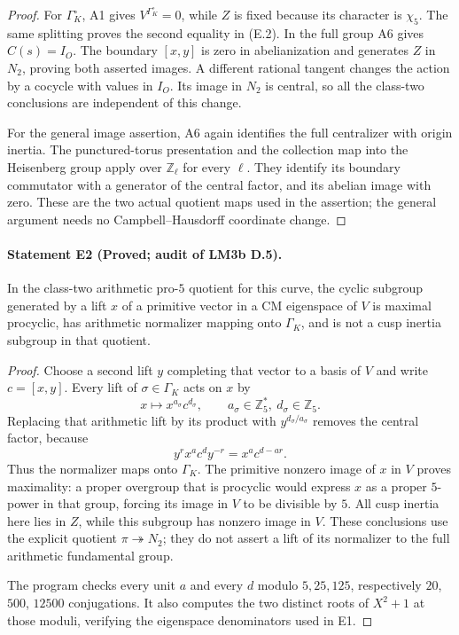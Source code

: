 \begin{proof}
For $\Gamma_K^\circ$, A1 gives $V^{\Gamma_K^\circ}=0$, while $Z$ is fixed because its character is $\chi_5$. The same splitting proves the second equality in (E.2). In the full group A6 gives $C(s)=I_O$. The boundary $[x,y]$ is zero in abelianization and generates $Z$ in $N_2$, proving both asserted images. A different rational tangent changes the action by a cocycle with values in $I_O$. Its image in $N_2$ is central, so all the class-two conclusions are independent of this change.

For the general image assertion, A6 again identifies the full centralizer
with origin inertia. The punctured-torus presentation and the collection
map into the Heisenberg group apply over $\mathbb Z_\ell$ for every
$\ell$. They identify its boundary commutator with a generator of the
central factor, and its abelian image with zero. These are the two actual
quotient maps used in the assertion; the general argument needs no
Campbell--Hausdorff coordinate change.
\end{proof}

\paragraph{Statement E2 (Proved; audit of LM3b D.5).}\label{res:E2}
In the class-two arithmetic pro-$5$ quotient for this curve, the cyclic subgroup generated by a lift $x$ of a primitive vector in a CM eigenspace of $V$ is maximal procyclic, has arithmetic normalizer mapping onto $\Gamma_K$, and is not a cusp inertia subgroup in that quotient.

\begin{proof}
Choose a second lift $y$ completing that vector to a basis of $V$ and write $c=[x,y]$. Every lift of $\sigma\in\Gamma_K$ acts on $x$ by
\[
 x\longmapsto x^{a_\sigma}c^{d_\sigma},\qquad
 a_\sigma\in\mathbb Z_5^*,\ d_\sigma\in\mathbb Z_5.
\]
Replacing that arithmetic lift by its product with $y^{d_\sigma/a_\sigma}$ removes the central factor, because
\[
 y^r x^a c^d y^{-r}=x^a c^{d-ar}.
\]
Thus the normalizer maps onto $\Gamma_K$. The primitive nonzero image of $x$ in $V$ proves maximality: a proper overgroup that is procyclic would express $x$ as a proper $5$-power in that group, forcing its image in $V$ to be divisible by $5$. All cusp inertia here lies in $Z$, while this subgroup has nonzero image in $V$. These conclusions use the explicit quotient $\pi\twoheadrightarrow N_2$; they do not assert a lift of its normalizer to the full arithmetic fundamental group.

The program checks every unit $a$ and every $d$ modulo $5,25,125$, respectively $20$, $500$, $12500$ conjugations. It also computes the two distinct roots of $X^2+1$ at those moduli, verifying the eigenspace denominators used in E1.
\end{proof}

